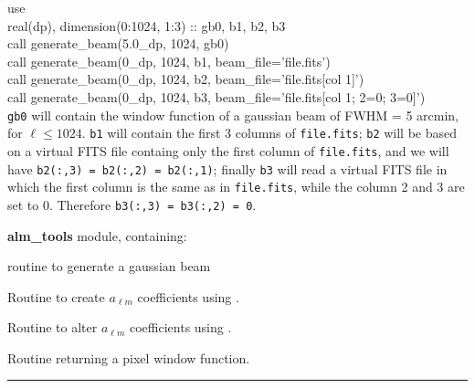 
\begin{example}
{
use  \\
real(dp), dimension(0:1024, 1:3) :: gb0, b1, b2, b3\\
call generate\_beam(5.0\_dp, 1024, gb0)\\
call generate\_beam(0\_dp, 1024, b1, beam\_file='file.fits')\\
call generate\_beam(0\_dp, 1024, b2, beam\_file='file.fits[col 1]')\\
call generate\_beam(0\_dp, 1024, b3, beam\_file='file.fits[col 1; 2=0; 3=0]')\\
}
{%
{\tt gb0} will contain the window function of a gaussian beam of FWHM = 5 arcmin, for $\ell
\leq 1024$.
{\tt b1} will contain the first 3 columns of {\tt file.fits}; {\tt b2} will be
based on a virtual FITS file containg only the first column of {\tt file.fits},
and we will have {\tt b2(:,3) = b2(:,2) = b2(:,1)}; finally {\tt b3} will read a
virtual FITS file in which the first column is the same as in {\tt file.fits},
while the column 2 and 3 are set to 0. Therefore {\tt b3(:,3) = b3(:,2) = 0}.
\label{sub:ex:generate_beam}
}
\end{example}



\begin{modules}
  \begin{sulist}{} %
  \item[\textbf{alm\_tools}] module, containing:
	\item[\htmlref{gaussbeam}{sub:gaussbeam}] routine to generate a gaussian beam
  \end{sulist}
\end{modules}

\begin{related}
  \begin{sulist}{} %
  \item[\htmlref{create\_alm}{sub:create_alm}] Routine to create $a_{\ell m}$
  coefficients using \thedocid.
  \item[\htmlref{alter\_alm}{sub:alter_alm}] Routine to alter $a_{\ell m}$
  coefficients  using \thedocid.
  \item[\htmlref{pixel\_window}{sub:pixel_window}] Routine returning a pixel
  window function.
  \end{sulist}
\end{related}

\rule{\hsize}{2mm}

\newpage
